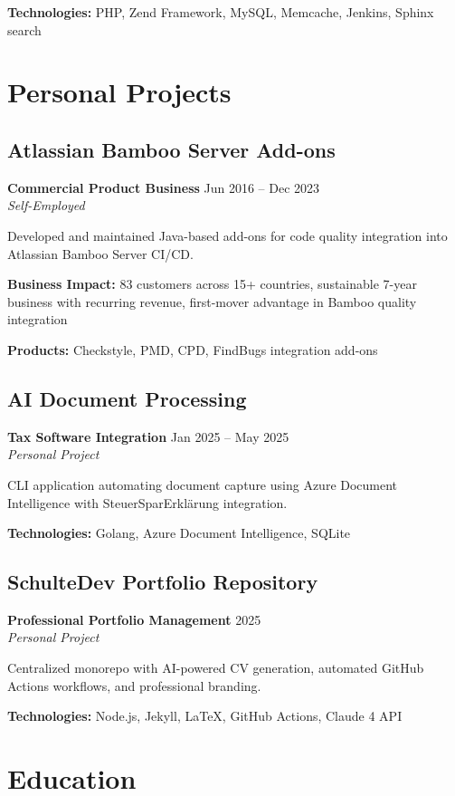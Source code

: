 \documentclass[11pt,a4paper]{article}
\newcommand{\role}[4]{\textbf{#1} \hfill #2 \\ \textit{#3} \hfill #4}
\begin{document}
\textbf{Technologies:} PHP, Zend Framework, MySQL, Memcache, Jenkins, Sphinx search

\section{Personal Projects}

\subsection{Atlassian Bamboo Server Add-ons}
\role{Commercial Product Business}{Jun 2016 -- Dec 2023}{Self-Employed}{}

Developed and maintained Java-based add-ons for code quality integration into Atlassian Bamboo Server CI/CD.

\textbf{Business Impact:} 83 customers across 15+ countries, sustainable 7-year business with recurring revenue, first-mover advantage in Bamboo quality integration

\textbf{Products:} Checkstyle, PMD, CPD, FindBugs integration add-ons

\subsection{AI Document Processing}
\role{Tax Software Integration}{Jan 2025 -- May 2025}{Personal Project}{}

CLI application automating document capture using Azure Document Intelligence with SteuerSparErklärung integration.

\textbf{Technologies:} Golang, Azure Document Intelligence, SQLite

\subsection{SchulteDev Portfolio Repository}
\role{Professional Portfolio Management}{2025}{Personal Project}{}

Centralized monorepo with AI-powered CV generation, automated GitHub Actions workflows, and professional branding.

\textbf{Technologies:} Node.js, Jekyll, LaTeX, GitHub Actions, Claude 4 API

\newpage

\section{Education}
\end{document}
